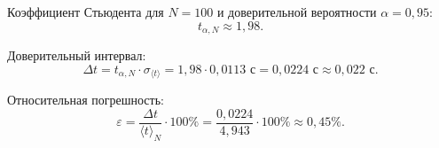 \documentclass[a4paper,12pt]{article}
\begin{document}
Коэффициент Стьюдента для $N = 100$ и доверительной вероятности $\alpha = 0{,}95$:
\begin{equation}
t_{\alpha, N} \approx 1{,}98.
\end{equation}

Доверительный интервал:
\begin{equation}
\Delta t = t_{\alpha, N} \cdot \sigma_{\langle t\rangle} = 1{,}98 \cdot 0{,}0113\text{ с} = 0{,}0224\text{ с} \approx 0{,}022\text{ с}.
\end{equation}

Относительная погрешность:
\begin{equation}
\varepsilon = \frac{\Delta t}{\langle t\rangle_N} \cdot 100\% = \frac{0{,}0224}{4{,}943} \cdot 100\% \approx 0{,}45\%.
\end{equation}

\newpage
\end{document}
